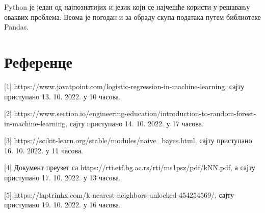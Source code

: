 \documentclass[11pt]{article} %
\begin{document}
Python је један од најпознатијих и језик који се најчешће користи у решавању оваквих проблема. Веома је погодан и за обраду скупа података путем библиотеке Pandas.

\newpage
\section{Референце}
[1] https://www.javatpoint.com/logistic-regression-in-machine-learning, сајту приступано 13. 10. 2022. у 10 часова.

[2] https://www.section.io/engineering-education/introduction-to-random-forest-in-machine-learning, сајту приступано 14. 10. 2022. у 17 часова.

[3] https://scikit-learn.org/stable/modules/naive\_bayes.html, сајту приступано 16. 10. 2022. у 11 часова.

[4] Документ преузет са https://rti.etf.bg.ac.rs/rti/ms1psz/pdf/kNN.pdf, а сајту приступано 17. 10. 2022. у 13 часова.

[5] https://laptrinhx.com/k-nearest-neighbors-unlocked-454254569/, сајту приступано 19. 10. 2022. у 16 часова.
\end{document}
